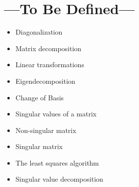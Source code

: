 
\chapter{---To Be Defined---}\label{tbd}
\begin{itemize}
  \item Diagonalization
  \item Matrix decomposition
  \item Linear transformations
  \item Eigendecomposition
  \item Change of Basis
  \item Singular values of a matrix
  \item Non-singular matrix
  \item Singular matrix
  \item The least squares algorithm
  \item Singular value decomposition
\end{itemize}